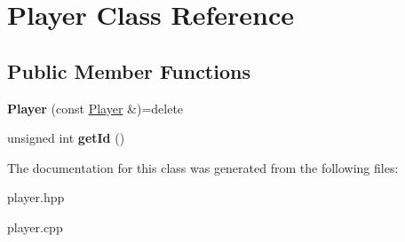 \hypertarget{classPlayer}{}\section{Player Class Reference}
\label{classPlayer}
\subsection*{Public Member Functions}
\begin{DoxyCompactItemize}
\item 
{\bfseries Player} (const \hyperlink{classPlayer}{Player} \&)=delete\hypertarget{classPlayer_ae8015d1f08ba69d663cfdaea1a64d1a4}{}\label{classPlayer_ae8015d1f08ba69d663cfdaea1a64d1a4}

\item 
unsigned int {\bfseries get\+Id} ()\hypertarget{classPlayer_aefc3db8fc54fab638b25764a4c37f078}{}\label{classPlayer_aefc3db8fc54fab638b25764a4c37f078}

\end{DoxyCompactItemize}


The documentation for this class was generated from the following files\+:\begin{DoxyCompactItemize}
\item 
player.\+hpp\item 
player.\+cpp\end{DoxyCompactItemize}
